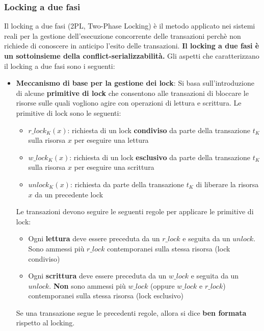 \documentclass[a4paper]{article}
\begin{document}
\subsubsection{Locking a due fasi}
Il locking a due fasi (2PL, Two-Phase Locking) è il metodo applicato nei sistemi reali
per la gestione dell'esecuzione concorrente delle transazioni perchè non richiede di
conoscere in anticipo l'esito delle transazioni. \textbf{Il locking a due fasi è un sottoinsieme
della conflict-serializzabilità.}
Gli aspetti che caratterizzano il locking a due fasi sono i seguenti:
\begin{itemize}
  \item \textbf{Meccanismo di base per la gestione dei lock}:
    Si basa sull'introduzione di alcune \textbf{primitive di lock} che consentono
    alle transazioni di bloccare le risorse sulle quali vogliono agire con operazioni
    di lettura e scrittura. Le primitive di lock sono le seguenti:
    \begin{itemize}
      \item \( r\_lock_K(x) \): richiesta di un lock \textbf{condiviso} da parte della
        transazione \( t_K \) sulla risorsa \( x \) per eseguire una lettura

      \item \( w\_lock_K(x) \): richiesta di un lock \textbf{esclusivo} da parte della
        transazione \( t_K \) sulla risorsa \( x \) per eseguire una scrittura

      \item \( unlock_K(x) \): richiesta da parte della transazione \( t_K \) di
        liberare la risorsa \( x \) da un precedente lock
    \end{itemize}
    Le transazioni devono seguire le seguenti regole per applicare le primitive di
    lock:
    \begin{itemize}
      \item Ogni \textbf{lettura} deve essere preceduta da un \( r\_lock \) e seguita
        da un \( unlock \). Sono ammessi più \( r\_lock \) contemporanei sulla stessa
        risorsa (lock condiviso)

      \item Ogni \textbf{scrittura} deve essere preceduta da un \( w\_lock \) e seguita
        da un \( unlock \). \textbf{Non} sono ammessi più \( w\_lock \) (oppure
        \( w\_lock \) e \( r\_lock \)) contemporanei sulla stessa risorsa (lock
        esclusivo)
    \end{itemize}
    Se una transazione segue le precedenti regole, allora si dice \textbf{ben formata}
    rispetto al locking.


\end{itemize}
\end{document}
